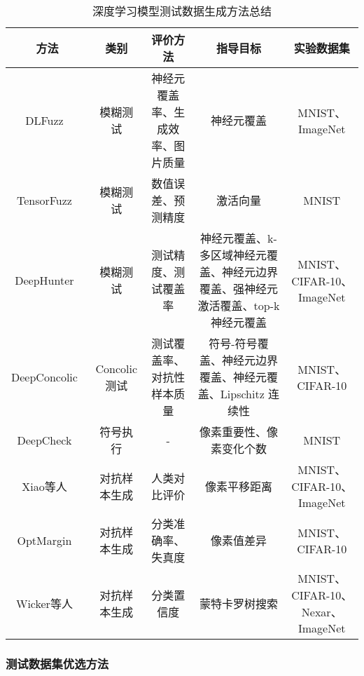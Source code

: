 \begin{table}[t]
	\small
	\centering
	\caption{深度学习模型测试数据生成方法总结}
	\label{tab:testingDataGen}
	\begin{tabular}{c|c|c|c|c}
		\toprule
		方法 & 类别 & 评价方法 & 指导目标 & 实验数据集 \\
		\midrule
		DLFuzz~\citess{Guo2018DLFuzz} & 模糊测试 & 神经元覆盖率、生成效率、图片质量 & 神经元覆盖 & MNIST、ImageNet \\
		\midrule
	    TensorFuzz~\citess{Odena2019TensorFuzz} & 模糊测试 & 数值误差、预测精度 & 激活向量 & MNIST \\
	    \midrule
	    DeepHunter~\citess{xie2019coverage} & 模糊测试 & 测试精度、测试覆盖率 & 神经元覆盖、k-多区域神经元覆盖、神经元边界覆盖、强神经元激活覆盖、top-k 神经元覆盖 & MNIST、CIFAR-10、ImageNet \\
		\midrule
		DeepConcolic~\citess{Sun2018Concolic} & Concolic测试 & 测试覆盖率、对抗性样本质量 & 符号-符号覆盖、神经元边界覆盖、神经元覆盖、Lipschitz 连续性 & MNIST、CIFAR-10 \\
		\midrule
		DeepCheck~\citess{Gopinath2018Symbolic} & 符号执行 & - & 像素重要性、像素变化个数 & MNIST \\
		\midrule
		Xiao等人~\citess{Xiao2018Spatially} & 对抗样本生成 & 人类对比评价 & 像素平移距离 & MNIST、CIFAR-10、ImageNet \\
		\midrule
		OptMargin~\citess{He2018Decision} & 对抗样本生成 & 分类准确率、失真度 & 像素值差异 & MNIST、CIFAR-10 \\
		\midrule
	    Wicker等人~\citess{Wicker2018FeatureGuided} & 对抗样本生成 & 分类置信度 & 蒙特卡罗树搜索 & MNIST、CIFAR-10、Nexar、ImageNet \\
		\bottomrule
	\end{tabular}
\end{table}




\subsubsection{测试数据集优选方法}


